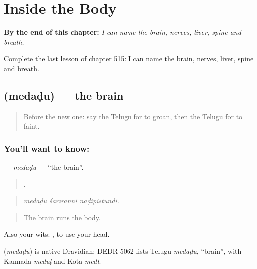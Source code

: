 
\chapter{Inside the Body}
\label{ch:te-inside-the-body}

\begin{chapteropening}
\textbf{By the end of this chapter:} \emph{I can name the brain, nerves, liver, spine and breath.}

Complete the last lesson of chapter 515: I can name the brain, nerves, liver, spine and breath.
\end{chapteropening}

\section[\texorpdfstring{\te{మెదడు} (medaḍu)}{మెదడు (medaḍu)}]{ (medaḍu) — the brain}

\label{lesson:TE-C515-medadu}



\begin{quote}
Before the new one: say the Telugu for to groan, then the Telugu for to faint.
\end{quote}

\subsection*{You'll want to know: }
\textbf{} — \emph{medaḍu} — \textquotedblleft{}the brain\textquotedblright{}.

\begin{quote}
  .
\end{quote}

\begin{quote}
\emph{medaḍu śarīrānni naḍipistundi.}
\end{quote}

\begin{quote}
The brain runs the body.
\end{quote}

Also your wits:  , to use your head.

\begin{cousinweb}
\textbf{} (\emph{medaḍu}) is native Dravidian: DEDR 5062 lists Telugu \emph{medaḍu}, \textquotedblleft{}brain\textquotedblright{}, with Kannada \emph{meduḷ} and Kota \emph{medl}.
\end{cousinweb}


